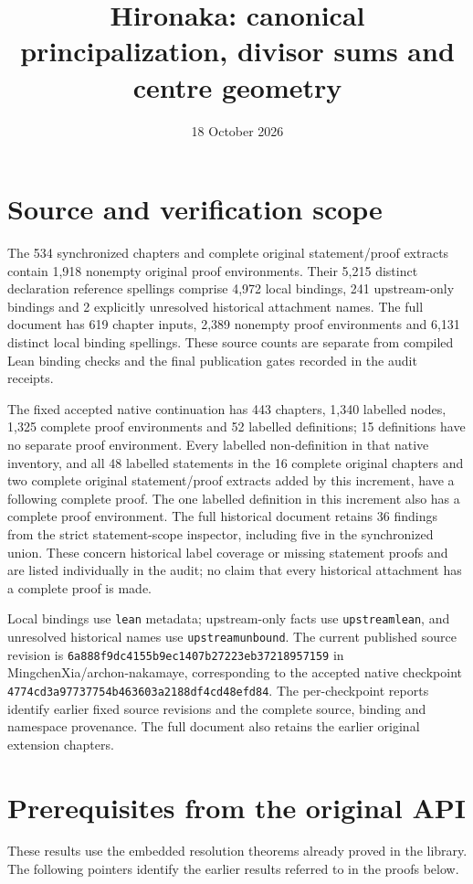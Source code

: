 \documentclass[11pt,a4paper]{article}
\title{Hironaka: canonical principalization, divisor sums and centre geometry}
\author{}
\date{18 October 2026}
\theoremstyle{definition}
\providecommand{\href}[2]{#2}
\begin{document}
\maketitle
\section*{Source and verification scope}
The 534 synchronized chapters and complete original statement/proof extracts
contain 1,918 nonempty original proof environments. Their 5,215 distinct
declaration reference spellings comprise 4,972 local bindings, 241 upstream-only
bindings and 2 explicitly unresolved historical attachment names. The full
document has 619 chapter inputs, 2,389 nonempty proof environments and 6,131 distinct
local binding spellings. These source counts are separate from compiled Lean
binding checks and the final publication gates recorded in the audit receipts.

The fixed accepted native continuation has 443 chapters, 1,340 labelled nodes,
1,325 complete proof environments and 52 labelled definitions; 15 definitions
have no separate proof environment. Every labelled non-definition in that
native inventory, and all 48 labelled statements in the 16 complete original
chapters and two complete original statement/proof extracts added by this
increment, have a following complete proof. The one labelled definition in
this increment also has a complete proof environment.
The full historical document retains 36 findings from the strict statement-scope
inspector, including five in the synchronized union. These concern historical
label coverage or missing statement proofs and are listed individually in the
audit; no claim that every historical attachment has a complete proof is made.

Local bindings use \texttt{lean} metadata; upstream-only facts use
\texttt{upstreamlean}, and unresolved historical names use
\texttt{upstreamunbound}. The current published source revision is
\texttt{6a888f9dc4155b9ec1407b27223eb37218957159} in
\href{https://github.com/MingchenXia/archon-nakamaye}{MingchenXia/archon-nakamaye},
corresponding to the accepted native checkpoint
\texttt{4774cd3a97737754b463603a2188df4cd48efd84}.
The per-checkpoint reports identify earlier fixed source revisions and the
complete source, binding and namespace provenance. The full document also
retains the earlier original extension chapters.
\section{Prerequisites from the original API}
These results use the embedded resolution theorems already proved in the library.
The following pointers identify the earlier results referred to in the proofs below.
\end{document}
